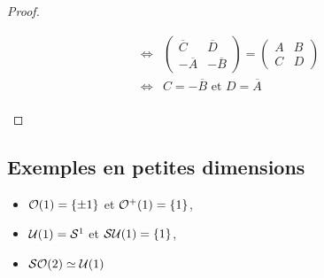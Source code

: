 \begin{proof}
\begin{enumerate}
\begin{displaymath}
\begin{array}{rl}
\Leftrightarrow & \begin{pmatrix}\overline{C}&\overline{D}\\
-\overline{A}&-\overline{B}
\end{pmatrix} = \begin{pmatrix}A&B\\C&D \end{pmatrix} \\
\Leftrightarrow& C = -\overline{B} \text{ et } D = \overline{A} \\
\end{array} \end{displaymath}
\end{enumerate}

\end{proof}


\vspace{0.5em}
\subsection{Exemples en petites dimensions}
\vspace{0.5em}

\begin{itemize}
 \item $\mathcal{O}(1) = \{\pm 1\}$ et $\mathcal{O}^+(1) = \{1\}$,
 \item $\mathcal{U}(1) = \mathcal{S}^1$ et $\mathcal{S}\mathcal{U}(1) = \{1\}$,
 \item $\mathcal{SO}(2) \simeq \mathcal{U}(1)$
\end{itemize}







